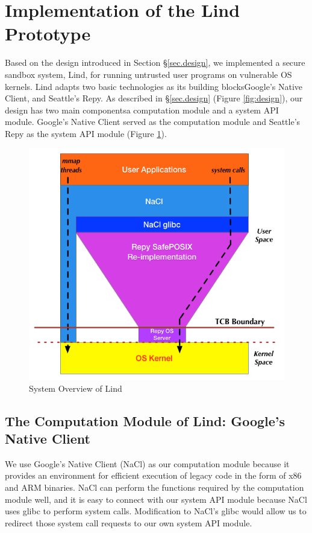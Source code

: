 \section{Implementation of the Lind Prototype}
\label{sec.implementation}

Based on the design introduced in Section \S{\ref{sec.design}}, 
we implemented a secure sandbox system, Lind, 
for running untrusted user programs on vulnerable OS kernels. 
Lind adapts two basic  technologies as its building blocks\textendash Google's Native Client, and Seattle's Repy. 
As described in \S{\ref{sec.design}} (Figure \ref{fig:design}), our design has  two main components\textendash a computation module 
and a system API module. Google's Native Client served as the computation module 
and Seattle's Repy as the system API module (Figure \ref{fig:architecture}).

\begin{figure}[h]
\centering
\includegraphics[width=1.0\columnwidth]{diagram/lind_architecture.png}
\caption{System Overview of Lind}
\label{fig:architecture}
\end{figure}

\subsection{The Computation Module of Lind: Google's Native Client}
We use Google's Native Client (NaCl) \cite{NaCl-09} as our computation module 
because it provides an environment for efficient execution of legacy code in the form of x86 and ARM binaries. 
NaCl can perform the functions required by the computation module well, and it is easy to 
connect with our system API module because NaCl uses glibc to perform system calls. 
Modification to NaCl's glibc would allow us to redirect those system call requests to our own system API module. 

